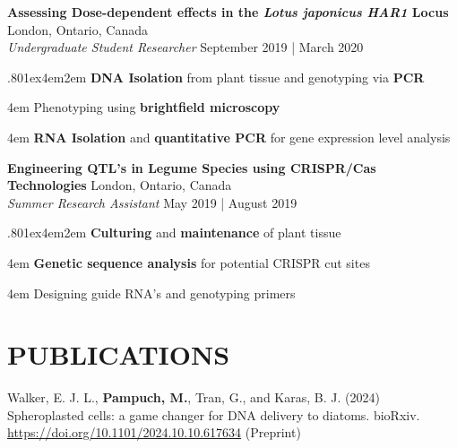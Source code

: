 \documentclass[a4paper,9pt]{extarticle}
\begin{document}
\noindent
\begin{minipage}{1\textwidth}
\setlength{\parindent}{15pt} %
	\noindent
	\textbf{Assessing Dose-dependent effects in the \textit{Lotus japonicus HAR1} Locus} \hfill London, Ontario, Canada\\ %
	\textit{Undergraduate Student Researcher}
	\hfill September 2019 | March 2020  \par %
	{\hsize.80\linewidth\parskip1ex\hangindent4em\parindent2em 
	\setlength{\parskip}{0pt} %
		\textbf{DNA Isolation} from plant tissue and genotyping via \textbf{PCR}\par
		\hangindent4em
		Phenotyping using \textbf{brightfield microscopy}\par
		\hangindent4em
		\textbf{RNA Isolation} and \textbf{quantitative PCR} for gene expression level analysis\par}
\end{minipage}
\vspace{\parskip}

\noindent
\begin{minipage}{1\textwidth}
\setlength{\parindent}{15pt} %
	\noindent
	\textbf{Engineering QTL's in Legume Species using CRISPR/Cas Technologies} \hfill London, Ontario, Canada\\ %
	\textit{Summer Research Assistant}
	\hfill May 2019 | August 2019 \par %
	{\hsize.80\linewidth\parskip1ex\hangindent4em\parindent2em 
	\setlength{\parskip}{0pt} %
		\textbf{Culturing} and \textbf{maintenance} of plant tissue \par
		\hangindent4em
		\textbf{Genetic sequence analysis} for potential CRISPR cut sites \par
		\hangindent4em
		Designing guide RNA's and genotyping primers \par}
\end{minipage}

\section*{PUBLICATIONS}

\noindent
\begin{minipage}{1\textwidth}
\setlength{\parindent}{15pt} %
	\noindent
	Walker, E. J. L., \textbf{Pampuch, M.}, Tran, G., and Karas, B. J. (2024) Spheroplasted cells: a game changer for DNA delivery to diatoms. bioRxiv. \href{https://doi.org/10.1101/2024.10.10.617634}{https://doi.org/10.1101/2024.10.10.617634} (Preprint) \\
\end{minipage}
\end{document}
